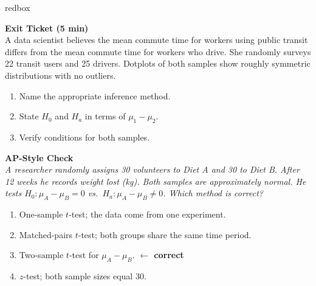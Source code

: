 \documentclass[10pt]{article}
\begin{document}
\begin{skillbox}{redbox}
\begin{minipage}[t]{0.48\linewidth}
    \textbf{Exit Ticket (5 min)}\\
    A data scientist believes the mean commute time for workers using public transit differs
    from the mean commute time for workers who drive. She randomly surveys 22 transit users
    and 25 drivers. Dotplots of both samples show roughly symmetric distributions with no
    outliers.
    \begin{enumerate}
        \item Name the appropriate inference method.
        \item State $H_0$ and $H_a$ in terms of $\mu_1 - \mu_2$.
        \item Verify conditions for both samples.
    \end{enumerate}
\end{minipage}
\hfill
\begin{minipage}[t]{0.48\linewidth}
    \textbf{AP-Style Check}\\
    \textit{A researcher randomly assigns 30 volunteers to Diet A and 30 to Diet B. After
    12 weeks he records weight lost (kg). Both samples are approximately normal. He tests
    $H_0: \mu_A - \mu_B = 0$ vs.\ $H_a: \mu_A - \mu_B \ne 0$. Which method is correct?}
    \begin{enumerate}[label=(\Alph*)]
        \item One-sample $t$-test; the data come from one experiment.
        \item Matched-pairs $t$-test; both groups share the same time period.
        \item Two-sample $t$-test for $\mu_A - \mu_B$. \textcolor{keyred}{\textbf{$\leftarrow$ correct}}
        \item $z$-test; both sample sizes equal 30.
    \end{enumerate}
\end{minipage}
\end{skillbox}
\end{document}
